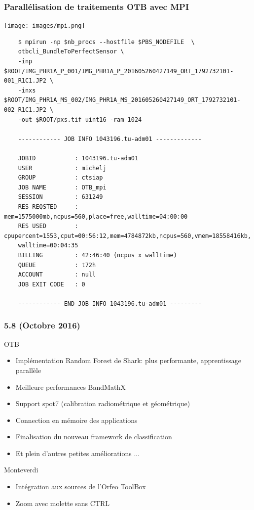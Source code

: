 \documentclass[8pt]{beamer}
\begin{document}
\begin{frame}[fragile]
\frametitle{Parallélisation de traitements OTB avec MPI}
\begin{center}
  \vspace{-0.5cm}
  \texttt{[image: images/mpi.png]}
  \begin{scriptsize}
\begin{verbatim}
    $ mpirun -np $nb_procs --hostfile $PBS_NODEFILE  \
    otbcli_BundleToPerfectSensor \
    -inp $ROOT/IMG_PHR1A_P_001/IMG_PHR1A_P_201605260427149_ORT_1792732101-001_R1C1.JP2 \
    -inxs $ROOT/IMG_PHR1A_MS_002/IMG_PHR1A_MS_201605260427149_ORT_1792732101-002_R1C1.JP2 \
    -out $ROOT/pxs.tif uint16 -ram 1024

    ------------ JOB INFO 1043196.tu-adm01 -------------
    
    JOBID           : 1043196.tu-adm01
    USER            : michelj
    GROUP           : ctsiap
    JOB NAME        : OTB_mpi
    SESSION         : 631249
    RES REQSTED     : mem=1575000mb,ncpus=560,place=free,walltime=04:00:00
    RES USED        : cpupercent=1553,cput=00:56:12,mem=4784872kb,ncpus=560,vmem=18558416kb,
    walltime=00:04:35
    BILLING         : 42:46:40 (ncpus x walltime)
    QUEUE           : t72h
    ACCOUNT         : null
    JOB EXIT CODE   : 0
    
    ------------ END JOB INFO 1043196.tu-adm01 ---------
\end{verbatim}
\end{scriptsize}
\end{center}
\end{frame}

\begin{frame}
\frametitle{5.8 (Octobre 2016)}
\begin{block}{OTB}
\begin{itemize}
\item Implémentation Random Forest de Shark: plus performante, apprentissage parallèle
\item Meilleure performances BandMathX
\item Support spot7 (calibration radiométrique et géométrique)
\item Connection en mémoire des applications
\item Finalisation  du nouveau framework de classification
\item Et plein d'autres petites améliorations ...
\end{itemize}
\end{block}

\begin{block}{Monteverdi}
\begin{itemize}
\item Intégration aux sources de l'Orfeo ToolBox
\item Zoom avec molette sans CTRL
\end{itemize}
\end{block}
\end{frame}
\end{document}
